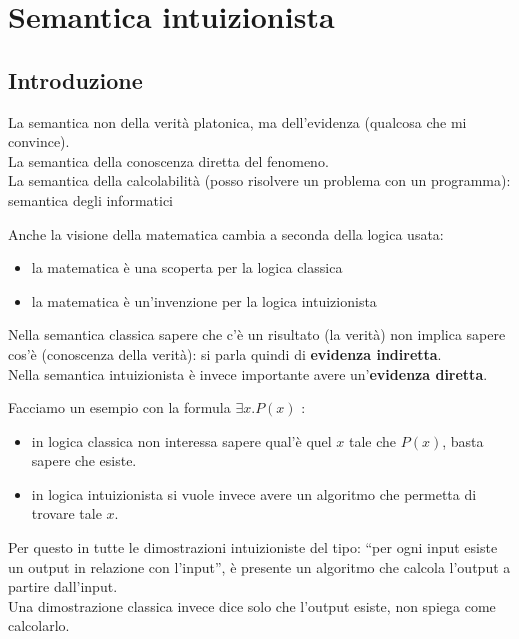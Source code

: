 \documentclass[
  a4paper,
]{article}
\providecommand{\tightlist}{%
  \setlength{\itemsep}{0pt}\setlength{\parskip}{0pt}}
\begin{document}
\newpage

\hypertarget{semantica-intuizionista}{%
\section{Semantica intuizionista}\label{semantica-intuizionista}}

\hypertarget{introduzione}{%
\subsection{Introduzione}\label{introduzione}}

La semantica non della verità platonica, ma dell'evidenza (qualcosa che
mi convince).\\
La semantica della conoscenza diretta del fenomeno.\\
La semantica della calcolabilità (posso risolvere un problema con un
programma): semantica degli informatici

Anche la visione della matematica cambia a seconda della logica usata:

\begin{itemize}
\tightlist
\item
  la matematica è una scoperta per la logica classica
\item
  la matematica è un'invenzione per la logica intuizionista
\end{itemize}

Nella semantica classica sapere che c'è un risultato (la verità) non
implica sapere cos'è (conoscenza della verità): si parla quindi di
\textbf{evidenza indiretta}.\\
Nella semantica intuizionista è invece importante avere
un'\textbf{evidenza diretta}.

Facciamo un esempio con la formula \(\exists x. P(x)\) :

\begin{itemize}
\tightlist
\item
  in logica classica non interessa sapere qual'è quel \(x\) tale che
  \(P(x)\), basta sapere che esiste.
\item
  in logica intuizionista si vuole invece avere un algoritmo che
  permetta di trovare tale \(x\).
\end{itemize}

Per questo in tutte le dimostrazioni intuizioniste del tipo: ``per ogni
input esiste un output in relazione con l'input'', è presente un
algoritmo che calcola l'output a partire dall'input.\\
Una dimostrazione classica invece dice solo che l'output esiste, non
spiega come calcolarlo.
\end{document}
